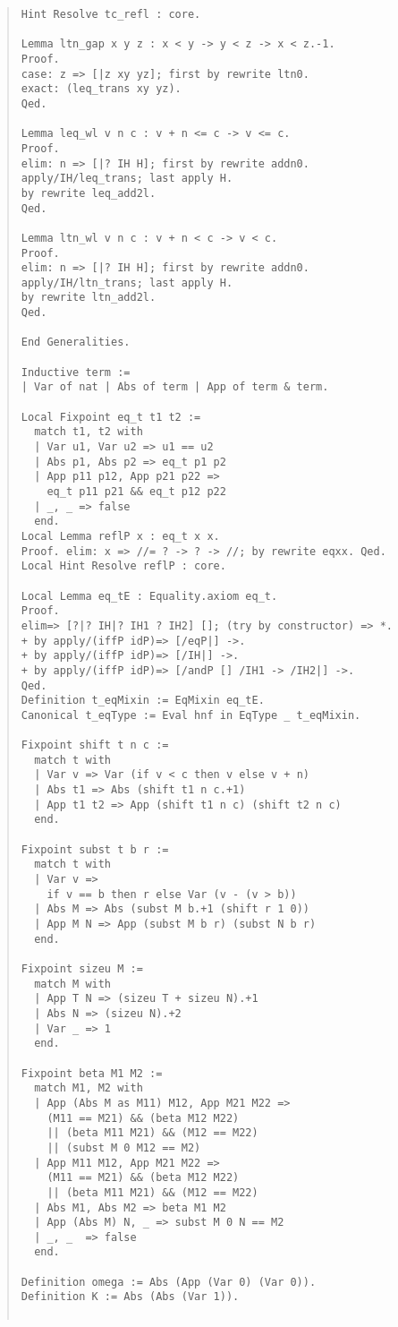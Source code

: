 \documentclass[12pt, titlepage]{ltjsarticle}
\begin{document}
\begin{quote}
\begin{verbatim}
Hint Resolve tc_refl : core.

Lemma ltn_gap x y z : x < y -> y < z -> x < z.-1.
Proof.
case: z => [|z xy yz]; first by rewrite ltn0.
exact: (leq_trans xy yz).
Qed.

Lemma leq_wl v n c : v + n <= c -> v <= c.
Proof.
elim: n => [|? IH H]; first by rewrite addn0.
apply/IH/leq_trans; last apply H.
by rewrite leq_add2l.
Qed.

Lemma ltn_wl v n c : v + n < c -> v < c.
Proof.
elim: n => [|? IH H]; first by rewrite addn0.
apply/IH/ltn_trans; last apply H.
by rewrite ltn_add2l.
Qed.

End Generalities.

Inductive term :=
| Var of nat | Abs of term | App of term & term.

Local Fixpoint eq_t t1 t2 := 
  match t1, t2 with
  | Var u1, Var u2 => u1 == u2
  | Abs p1, Abs p2 => eq_t p1 p2
  | App p11 p12, App p21 p22 =>
    eq_t p11 p21 && eq_t p12 p22
  | _, _ => false
  end.
Local Lemma reflP x : eq_t x x.
Proof. elim: x => //= ? -> ? -> //; by rewrite eqxx. Qed.
Local Hint Resolve reflP : core.

Local Lemma eq_tE : Equality.axiom eq_t.
Proof.
elim=> [?|? IH|? IH1 ? IH2] []; (try by constructor) => *.
+ by apply/(iffP idP)=> [/eqP|] ->.
+ by apply/(iffP idP)=> [/IH|] ->.
+ by apply/(iffP idP)=> [/andP [] /IH1 -> /IH2|] ->.
Qed.
Definition t_eqMixin := EqMixin eq_tE.
Canonical t_eqType := Eval hnf in EqType _ t_eqMixin.

Fixpoint shift t n c :=
  match t with
  | Var v => Var (if v < c then v else v + n)
  | Abs t1 => Abs (shift t1 n c.+1)
  | App t1 t2 => App (shift t1 n c) (shift t2 n c)
  end.

Fixpoint subst t b r :=
  match t with
  | Var v =>
    if v == b then r else Var (v - (v > b))
  | Abs M => Abs (subst M b.+1 (shift r 1 0))
  | App M N => App (subst M b r) (subst N b r)
  end.

Fixpoint sizeu M :=
  match M with
  | App T N => (sizeu T + sizeu N).+1
  | Abs N => (sizeu N).+2
  | Var _ => 1
  end.

Fixpoint beta M1 M2 :=
  match M1, M2 with
  | App (Abs M as M11) M12, App M21 M22 =>
    (M11 == M21) && (beta M12 M22)
    || (beta M11 M21) && (M12 == M22)
    || (subst M 0 M12 == M2)
  | App M11 M12, App M21 M22 =>
    (M11 == M21) && (beta M12 M22)
    || (beta M11 M21) && (M12 == M22)
  | Abs M1, Abs M2 => beta M1 M2
  | App (Abs M) N, _ => subst M 0 N == M2
  | _, _  => false
  end.

Definition omega := Abs (App (Var 0) (Var 0)).
Definition K := Abs (Abs (Var 1)).


\end{verbatim}
\end{quote}
\end{document}

